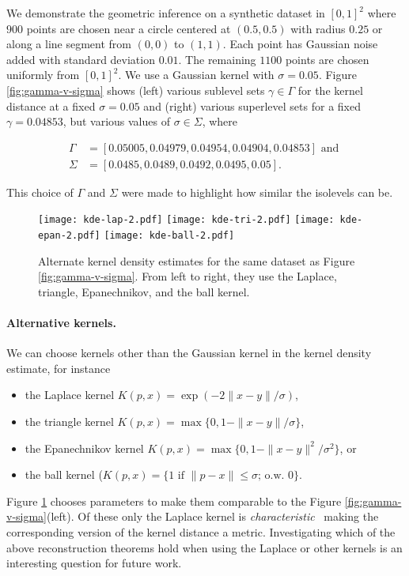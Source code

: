 \documentclass[11pt]{myclass}
\begin{document}
We demonstrate the geometric inference on a synthetic dataset in $[0,1]^2$ where $900$ points are chosen near a circle centered at $(0.5,0.5)$ with radius $0.25$ or along a line segment from $(0,0)$ to $(1,1)$.  Each point has Gaussian noise added with standard deviation $0.01$.  The remaining $1100$ points are chosen uniformly from $[0,1]^2$.  
We use a Gaussian kernel with $\sigma = 0.05$.  
Figure \ref{fig:gamma-v-sigma} shows 
(left) various sublevel sets $\gamma \in \Gamma$ for the kernel distance at a fixed $\sigma = 0.05$ and (right) various superlevel sets for a fixed $\gamma = 0.04853$, but various values of $\sigma \in \Sigma$, where

\begin{align*}
\Gamma &= [0.05005, 0.04979, 0.04954, 0.04904, 0.04853] \text{ and }
\\
\Sigma &= [0.0485, 0.0489, 0.0492, 0.0495, 0.05].
\end{align*}

\noindent
This choice of $\Gamma$ and $\Sigma$ were made to highlight how similar the isolevels can be.  



\begin{figure}
\texttt{[image: kde-lap-2.pdf]}
\hspace{0.3mm}
\texttt{[image: kde-tri-2.pdf]}
\hspace{0.3mm}
\texttt{[image: kde-epan-2.pdf]}
\hspace{0.3mm}
\texttt{[image: kde-ball-2.pdf]}

\caption{\label{fig:TEB}  
\small \sffamily
Alternate kernel density estimates for the same dataset as Figure \ref{fig:gamma-v-sigma}.  From left to right, they use the Laplace, triangle, Epanechnikov, and the ball kernel.}
\end{figure}



\paragraph{Alternative kernels.}
We can choose kernels other than the Gaussian kernel in the kernel density estimate, for instance 
\begin{itemize} \denselist
\item the Laplace kernel $K(p,x) = \exp(-2\|x-y\|/\sigma)$, 
\item the triangle kernel $K(p,x) = \max \{0, 1-\|x-y\|/\sigma\}$, 
\item the Epanechnikov kernel $K(p,x) = \max \{0, 1 - \|x-y\|^2/\sigma^2\}$, or 
\item the ball kernel ($K(p,x) = \{1 \text{ if } \|p-x\| \leq \sigma \text{; o.w. } 0\}$.   
\end{itemize}
Figure \ref{fig:TEB} chooses parameters to make them comparable to the Figure \ref{fig:gamma-v-sigma}(left).  
Of these only the Laplace kernel is \emph{characteristic}~\cite{SGFSL10} making the corresponding version of the kernel distance a metric.  Investigating which of the above reconstruction theorems hold when using the Laplace or other kernels is an interesting question for future work.  
\end{document}
